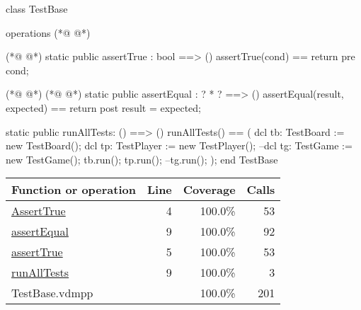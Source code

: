 \begin{vdmpp}[breaklines=true]
class TestBase

operations
(*@
\label{AssertTrue:4}
@*)
 
(*@
\label{assertTrue:5}
@*)
 static public assertTrue : bool ==> ()
  assertTrue(cond) == return
 pre cond;
  
(*@
\label{assertEqual:9}
@*)
(*@
\label{runAllTests:9}
@*)
 static public assertEqual : ? * ? ==> ()
  assertEqual(result, expected) == return
 post result = expected;
  
 static public runAllTests: () ==> ()
  runAllTests() == (
    dcl tb: TestBoard := new TestBoard();
    dcl tp: TestPlayer := new TestPlayer();
    --dcl tg: TestGame := new TestGame();
    tb.run();
    tp.run();
    --tg.run();
    );
end TestBase
\end{vdmpp}
\bigskip
\begin{longtable}{|l|r|r|r|}
\hline
Function or operation & Line & Coverage & Calls \\
\hline
\hline
\hyperref[AssertTrue:4]{AssertTrue} & 4&100.0\% & 53 \\
\hline
\hyperref[assertEqual:9]{assertEqual} & 9&100.0\% & 92 \\
\hline
\hyperref[assertTrue:5]{assertTrue} & 5&100.0\% & 53 \\
\hline
\hyperref[runAllTests:9]{runAllTests} & 9&100.0\% & 3 \\
\hline
\hline
TestBase.vdmpp & & 100.0\% & 201 \\
\hline
\end{longtable}


